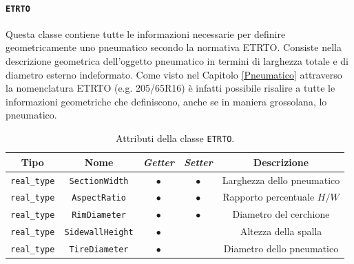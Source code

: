 \paragraph{\texttt{ETRTO}}
Questa classe contiene tutte le informazioni necessarie per definire geometricamente uno pneumatico secondo la normativa \ac{ETRTO}. Consiste nella descrizione geometrica dell'oggetto pneumatico in termini di larghezza totale e di diametro esterno indeformato. Come visto nel Capitolo \ref{Pneumatico} attraverso la nomenclatura \ac{ETRTO} (e.g. 205/65R16) è infatti possibile risalire a tutte le informazioni geometriche che definiscono, anche se in maniera grossolana, lo pneumatico.
\begin{table}[h!]
	\centering
	\begin{tabular}{|c|c|c|c|c|}
		\hline 
		\textbf{Tipo} & \textbf{Nome} & \textit{\textbf{Getter}} & \textit{\textbf{Setter}} & \textbf{Descrizione} \\ \hline 
		\texttt{real\_type} & \texttt{SectionWidth} & $\bullet$ & $\bullet$ & Larghezza dello pneumatico \\ \hline 
		\texttt{real\_type} & \texttt{AspectRatio} & $\bullet$ & $\bullet$ & Rapporto percentuale $H/W$ \\ \hline
		\texttt{real\_type} & \texttt{RimDiameter} & $\bullet$ & $\bullet$ & Diametro del cerchione\\ \hline
		\texttt{real\_type} & \texttt{SidewallHeight} & $\bullet$ & & Altezza della spalla \\ \hline
		\texttt{real\_type} & \texttt{TireDiameter} & $\bullet$ & & Diametro dello pneumatico\\ \hline
	\end{tabular}
	\caption{Attributi della classe \texttt{ETRTO}.}
	\label{}
\end{table}
%
